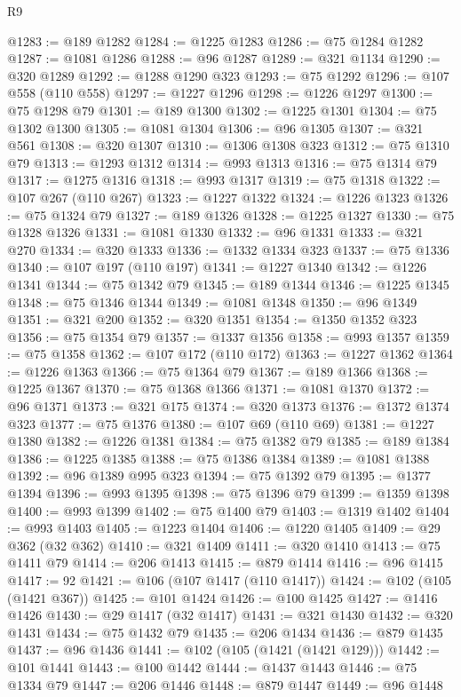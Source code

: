 \begin{lexlean}{R9}
\begin{coremodule}
@1283 := @189 @1282
@1284 := @1225 @1283
@1286 := @75 @1284 @1282
@1287 := @1081 @1286
@1288 := @96 @1287
@1289 := @321 @1134
@1290 := @320 @1289
@1292 := @1288 @1290 @323
@1293 := @75 @1292
@1296 := @107 @558 (@110 @558)
@1297 := @1227 @1296
@1298 := @1226 @1297
@1300 := @75 @1298 @79
@1301 := @189 @1300
@1302 := @1225 @1301
@1304 := @75 @1302 @1300
@1305 := @1081 @1304
@1306 := @96 @1305
@1307 := @321 @561
@1308 := @320 @1307
@1310 := @1306 @1308 @323
@1312 := @75 @1310 @79
@1313 := @1293 @1312
@1314 := @993 @1313
@1316 := @75 @1314 @79
@1317 := @1275 @1316
@1318 := @993 @1317
@1319 := @75 @1318
@1322 := @107 @267 (@110 @267)
@1323 := @1227 @1322
@1324 := @1226 @1323
@1326 := @75 @1324 @79
@1327 := @189 @1326
@1328 := @1225 @1327
@1330 := @75 @1328 @1326
@1331 := @1081 @1330
@1332 := @96 @1331
@1333 := @321 @270
@1334 := @320 @1333
@1336 := @1332 @1334 @323
@1337 := @75 @1336
@1340 := @107 @197 (@110 @197)
@1341 := @1227 @1340
@1342 := @1226 @1341
@1344 := @75 @1342 @79
@1345 := @189 @1344
@1346 := @1225 @1345
@1348 := @75 @1346 @1344
@1349 := @1081 @1348
@1350 := @96 @1349
@1351 := @321 @200
@1352 := @320 @1351
@1354 := @1350 @1352 @323
@1356 := @75 @1354 @79
@1357 := @1337 @1356
@1358 := @993 @1357
@1359 := @75 @1358
@1362 := @107 @172 (@110 @172)
@1363 := @1227 @1362
@1364 := @1226 @1363
@1366 := @75 @1364 @79
@1367 := @189 @1366
@1368 := @1225 @1367
@1370 := @75 @1368 @1366
@1371 := @1081 @1370
@1372 := @96 @1371
@1373 := @321 @175
@1374 := @320 @1373
@1376 := @1372 @1374 @323
@1377 := @75 @1376
@1380 := @107 @69 (@110 @69)
@1381 := @1227 @1380
@1382 := @1226 @1381
@1384 := @75 @1382 @79
@1385 := @189 @1384
@1386 := @1225 @1385
@1388 := @75 @1386 @1384
@1389 := @1081 @1388
@1392 := @96 @1389 @995 @323
@1394 := @75 @1392 @79
@1395 := @1377 @1394
@1396 := @993 @1395
@1398 := @75 @1396 @79
@1399 := @1359 @1398
@1400 := @993 @1399
@1402 := @75 @1400 @79
@1403 := @1319 @1402
@1404 := @993 @1403
@1405 := @1223 @1404
@1406 := @1220 @1405
@1409 := @29 @362 (@32 @362)
@1410 := @321 @1409
@1411 := @320 @1410
@1413 := @75 @1411 @79
@1414 := @206 @1413
@1415 := @879 @1414
@1416 := @96 @1415
@1417 := 92
@1421 := @106 (@107 @1417 (@110 @1417))
@1424 := @102 (@105 (@1421 @367))
@1425 := @101 @1424
@1426 := @100 @1425
@1427 := @1416 @1426
@1430 := @29 @1417 (@32 @1417)
@1431 := @321 @1430
@1432 := @320 @1431
@1434 := @75 @1432 @79
@1435 := @206 @1434
@1436 := @879 @1435
@1437 := @96 @1436
@1441 := @102 (@105 (@1421 (@1421 @129)))
@1442 := @101 @1441
@1443 := @100 @1442
@1444 := @1437 @1443
@1446 := @75 @1334 @79
@1447 := @206 @1446
@1448 := @879 @1447
@1449 := @96 @1448

\end{coremodule}
\end{lexlean}
